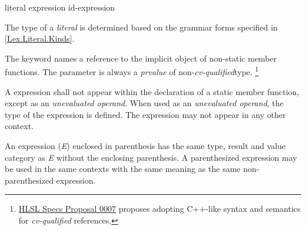 
\begin{grammar}
  \br
  literal\br
  \br
  \terminal{(} expression \terminal{)}\br
  id-expression\br
\end{grammar}


\p The type of a \textit{literal} is determined based on the grammar forms
specified in \ref{Lex.Literal.Kinds}.


\p The keyword  names a reference to the implicit object of
non-static member functions. The  parameter is always a
\textit{prvalue} of non-\textit{cv-qualified}type.
\footnote{
  \href{https://github.com/microsoft/hlsl-specs/blob/main/proposals/0007-const-instance-methods.md}
  {HLSL Specs Proposal 0007} proposes adopting C++-like syntax and semantics for
  \textit{cv-qualified}  references.}
  
\p A  expression shall not appear within the declaration of a
static member function, except as an \textit{unevaluated operand}. When used as
an \textit{unevaluated operand}, the type of the  expression is
defined.
\p The  expression may not appear in any other context.


\p An expression (\textit{E}) enclosed in parenthesis has the same type, result
and value category as \textit{E} without the enclosing parenthesis. A
parenthesized expression may be used in the same contexts with the same meaning
as the same non-parenthesized expression.
